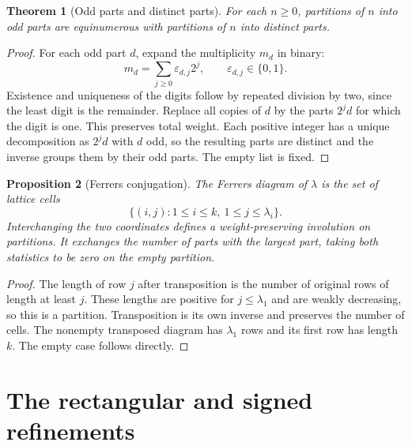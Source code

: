 \documentclass[11pt,oneside,openany]{book}
\theoremstyle{plain}
\newtheorem{theorem}{Theorem}[chapter]
\newtheorem{proposition}[theorem]{Proposition}
\theoremstyle{definition}
\theoremstyle{remark}
\begin{document}
\begin{theorem}[Odd parts and distinct parts]\label{p204:W26}
For each \(n\ge0\), partitions of \(n\) into odd parts are
equinumerous with partitions of \(n\) into distinct parts.
\end{theorem}
\begin{proof}
For each odd part \(d\), expand the multiplicity \(m_d\)
in binary:
\[
 m_d=\sum_{j\ge0}\varepsilon_{d,j}2^j,\qquad
 \varepsilon_{d,j}\in\{0,1\}.
\]
Existence and uniqueness of the digits follow
by repeated division by two, since the least digit is the
remainder. Replace all copies of \(d\) by the parts \(2^jd\)
for which the digit is one. This preserves total weight.
Each positive integer has a unique decomposition as \(2^jd\)
with \(d\) odd, so the resulting parts are distinct and the
inverse groups them by their odd parts. The empty list is
fixed.
\end{proof}

\begin{proposition}[Ferrers conjugation]\label{p204:W27}
The Ferrers diagram of \(\lambda\) is the set of lattice cells
\[
 \{(i,j):1\le i\le k,\ 1\le j\le\lambda_i\}.
\]
Interchanging the two coordinates defines a weight-preserving
involution on partitions. It exchanges the number of parts with
the largest part, taking both statistics to be zero on the empty
partition.
\end{proposition}
\begin{proof}
The length of row \(j\) after transposition is the number of
original rows of length at least \(j\). These lengths are positive
for \(j\le\lambda_1\) and are weakly decreasing, so this is
a partition. Transposition is its own inverse and preserves the
number of cells. The nonempty transposed diagram has \(\lambda_1\)
rows and its first row has length \(k\). The empty case follows
directly.
\end{proof}

\section{The rectangular and signed refinements}
\end{document}
